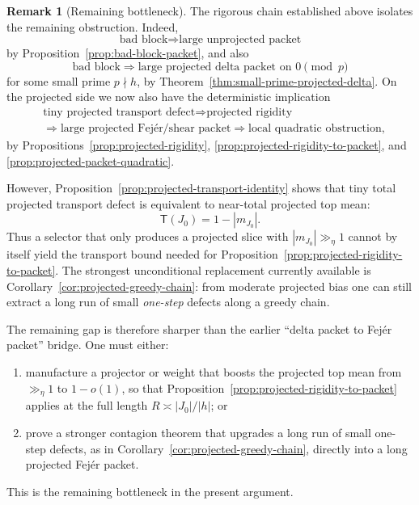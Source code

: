 \documentclass[11pt]{scrartcl}
\numberwithin{equation}{section}
\theoremstyle{definition}
\newtheorem{remark}[theorem]{Remark}
\newcommand{\1}{\mathbf 1}
\begin{document}
\begin{remark}[Remaining bottleneck]
\label{rem:current-bottleneck}
The rigorous chain established above isolates the remaining obstruction. Indeed,
\[
\text{bad block}
\Longrightarrow
\text{large unprojected packet}
\]
by Proposition~\ref{prop:bad-block-packet}, and also
\[
\text{bad block}
\Longrightarrow
\text{large projected delta packet on }0\!\!\pmod p
\]
for some small prime $p\nmid h$, by Theorem~\ref{thm:small-prime-projected-delta}. On the projected side we now also have the deterministic implication
\begin{align*}
&\text{tiny projected transport defect}
\Longrightarrow
\text{projected rigidity}\\
&\Longrightarrow
\text{large projected Fej\'er/shear packet}
\Longrightarrow
\text{local quadratic obstruction},
\end{align*}
by Propositions~\ref{prop:projected-rigidity}, \ref{prop:projected-rigidity-to-packet}, and \ref{prop:projected-packet-quadratic}.

However, Proposition~\ref{prop:projected-transport-identity} shows that tiny total projected transport defect is equivalent to near-total projected top mean:
\[
\mathsf T(J_0)=1-|m_{J_0}|.
\]
Thus a selector that only produces a projected slice with $|m_{J_0}|\gg_\eta 1$ cannot by itself yield the transport bound needed for Proposition~\ref{prop:projected-rigidity-to-packet}. The strongest unconditional replacement currently available is Corollary~\ref{cor:projected-greedy-chain}: from moderate projected bias one can still extract a long run of small \emph{one-step} defects along a greedy chain.

The remaining gap is therefore sharper than the earlier ``delta packet to Fej\'er packet'' bridge. One must either:
\begin{enumerate}[label=(\roman*)]
\item manufacture a projector or weight that boosts the projected top mean from $\gg_\eta 1$ to $1-o(1)$, so that Proposition~\ref{prop:projected-rigidity-to-packet} applies at the full length $R\asymp |J_0|/|h|$; or
\item prove a stronger contagion theorem that upgrades a long run of small one-step defects, as in Corollary~\ref{cor:projected-greedy-chain}, directly into a long projected Fej\'er packet.
\end{enumerate}
This is the remaining bottleneck in the present argument.
\end{remark}
\end{document}
